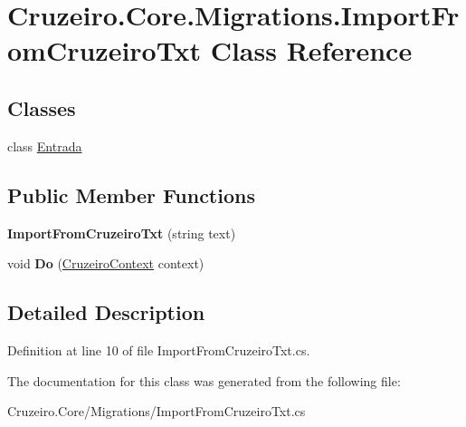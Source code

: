 \hypertarget{class_cruzeiro_1_1_core_1_1_migrations_1_1_import_from_cruzeiro_txt}{}\section{Cruzeiro.\+Core.\+Migrations.\+Import\+From\+Cruzeiro\+Txt Class Reference}
\label{class_cruzeiro_1_1_core_1_1_migrations_1_1_import_from_cruzeiro_txt}
\subsection*{Classes}
\begin{DoxyCompactItemize}
\item 
class \hyperlink{class_cruzeiro_1_1_core_1_1_migrations_1_1_import_from_cruzeiro_txt_1_1_entrada}{Entrada}
\end{DoxyCompactItemize}
\subsection*{Public Member Functions}
\begin{DoxyCompactItemize}
\item 
{\bfseries Import\+From\+Cruzeiro\+Txt} (string text)\hypertarget{class_cruzeiro_1_1_core_1_1_migrations_1_1_import_from_cruzeiro_txt_a36d9fea860fdef6f95cd4576a1715ccb}{}\label{class_cruzeiro_1_1_core_1_1_migrations_1_1_import_from_cruzeiro_txt_a36d9fea860fdef6f95cd4576a1715ccb}

\item 
void {\bfseries Do} (\hyperlink{class_cruzeiro_1_1_core_1_1_model_1_1_context_1_1_cruzeiro_context}{Cruzeiro\+Context} context)\hypertarget{class_cruzeiro_1_1_core_1_1_migrations_1_1_import_from_cruzeiro_txt_a0daffe7ee4d71c0dfc136645fa9d1145}{}\label{class_cruzeiro_1_1_core_1_1_migrations_1_1_import_from_cruzeiro_txt_a0daffe7ee4d71c0dfc136645fa9d1145}

\end{DoxyCompactItemize}


\subsection{Detailed Description}


Definition at line 10 of file Import\+From\+Cruzeiro\+Txt.\+cs.



The documentation for this class was generated from the following file\+:\begin{DoxyCompactItemize}
\item 
Cruzeiro.\+Core/\+Migrations/Import\+From\+Cruzeiro\+Txt.\+cs\end{DoxyCompactItemize}
